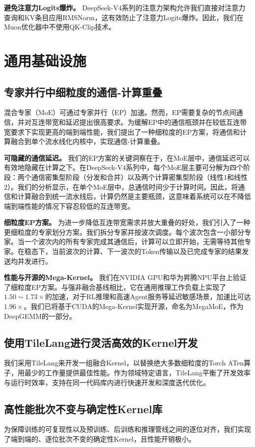 \documentclass[11pt,a4paper]{article}
\newcommand{\dsvfour}{DeepSeek-V4}
\newcommand{\moe}{MoE}
\begin{document}
\textbf{避免注意力Logits爆炸。} \dsvfour 系列的注意力架构允许我们直接对注意力查询和KV条目应用RMSNorm，这有效防止了注意力Logits爆炸。因此，我们在Muon优化器中不使用QK-Clip技术。

\section{通用基础设施}

\subsection{专家并行中细粒度的通信-计算重叠}
混合专家（\moe{}）可通过专家并行（EP）加速。然而，EP需要复杂的节点间通信，并对互连带宽和延迟提出很高要求。为缓解EP中的通信瓶颈并在较低互连带宽要求下实现更高的端到端性能，我们提出了一种细粒度的EP方案，将通信和计算融合到单个流水线化内核中，实现通信-计算重叠。

\textbf{可隐藏的通信延迟。} 我们的EP方案的关键洞察在于，在\moe{}层中，通信延迟可以有效地隐藏在计算之下。在\dsvfour 系列中，每个\moe{}层主要可分解为四个阶段：两个通信密集型阶段（分发和合并）以及两个计算密集型阶段（线性1和线性2）。我们的分析显示，在单个\moe{}层中，总通信时间少于计算时间。因此，将通信和计算融合到统一流水线后，计算仍然是主要瓶颈，这意味着系统可以在不降低端到端性能的情况下容忍较低的互连带宽。

\textbf{细粒度EP方案。} 为进一步降低互连带宽需求并放大重叠的好处，我们引入了一种更细粒度的专家划分方案。我们拆分专家并按波次调度。每个波次包含一小部分专家。当一个波次内的所有专家完成其通信后，计算可以立即开始，无需等待其他专家。在稳态下，当前波次的计算、下一波次的Token传输以及已完成专家的结果发送均并发进行。

\textbf{性能与开源的Mega-Kernel。} 我们在NVIDIA GPU和华为昇腾NPU平台上验证了细粒度EP方案。与强非融合基线相比，它在通用推理工作负载上实现了\(1.50 \sim 1.73 \times\)的加速，对于RL推理和高速Agent服务等延迟敏感场景，加速比可达\(1.96 \times\)。我们已将基于CUDA的Mega-Kernel实现开源，命名为MegaMoE，作为DeepGEMM的一部分。

\subsection{使用TileLang进行灵活高效的Kernel开发}
我们采用TileLang来开发一组融合Kernel，以替换绝大多数细粒度的Torch ATen算子，用最少的工作量提供最佳性能。作为领域特定语言，TileLang平衡了开发效率与运行时效率，支持在同一代码库内进行快速开发和深度迭代优化。

\subsection{高性能批次不变与确定性Kernel库}
为保障训练的可复现性以及预训练、后训练和推理管线之间的逐位对齐，我们实现了端到端的、逐位批次不变的确定性Kernel，且性能开销极小。
\end{document}
